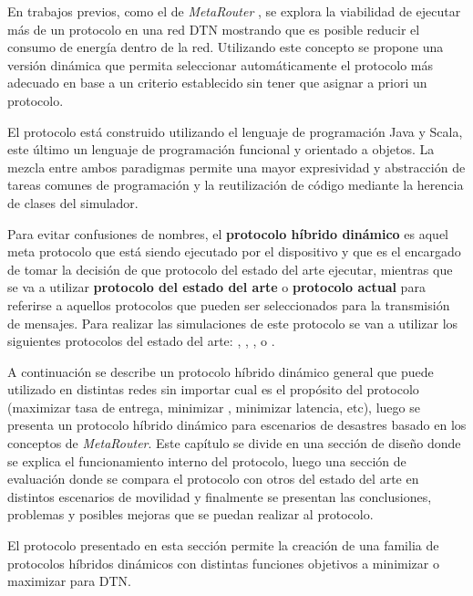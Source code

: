 En trabajos previos, como el de \textit{MetaRouter}
\cite{paper_evaluacion_nosotros}, se explora la viabilidad de ejecutar más de un
protocolo en una red DTN mostrando que es posible reducir el consumo de energía
dentro de la red. Utilizando este concepto se propone una versión dinámica que
permita seleccionar automáticamente el protocolo más adecuado en base a un
criterio establecido sin tener que asignar a priori un protocolo.

El protocolo está construido utilizando el lenguaje de programación Java y
Scala, este último un lenguaje de programación funcional y orientado a objetos.
La mezcla entre ambos paradigmas permite una mayor expresividad y abstracción de
tareas comunes de programación y la reutilización de código mediante la herencia
de clases del simulador.

Para evitar confusiones de nombres, el \textbf{protocolo híbrido dinámico} es
aquel meta protocolo que está siendo ejecutado por el dispositivo y que es el
encargado de tomar la decisión de que protocolo del estado del arte ejecutar,
mientras que se va a utilizar \textbf{protocolo del estado del arte} o
\textbf{protocolo actual} para referirse a aquellos protocolos que pueden ser
seleccionados para la transmisión de mensajes. Para realizar las simulaciones de
este protocolo se van a utilizar los siguientes protocolos del estado del arte:
\syw{} \cite{spyropoulos_spray_2005}, \syf{} \cite{spyropoulos_spray_2007},
\epidemic{} \cite{amin_vahdat_epidemic_2000}, \maxprop{}
\cite{burgess_maxprop:_2006} o \prophet{} \cite{lindgren_probabilistic_2003}.


A continuación se describe un protocolo híbrido dinámico general que puede
utilizado en distintas redes sin importar cual es el propósito del protocolo
(maximizar tasa de entrega, minimizar \overhead, minimizar latencia, etc), luego
se presenta un protocolo híbrido dinámico para escenarios de desastres basado en
los conceptos de \textit{MetaRouter}.  Este capítulo se divide en una sección de
diseño donde se explica el funcionamiento interno del protocolo, luego una
sección de evaluación donde se compara el protocolo con otros del estado del
arte en distintos escenarios de movilidad y finalmente se presentan las
conclusiones, problemas y posibles mejoras que se puedan realizar al protocolo.



El protocolo presentado en esta sección permite la creación de una familia de
protocolos híbridos dinámicos con distintas funciones objetivos a minimizar o
maximizar para DTN.

